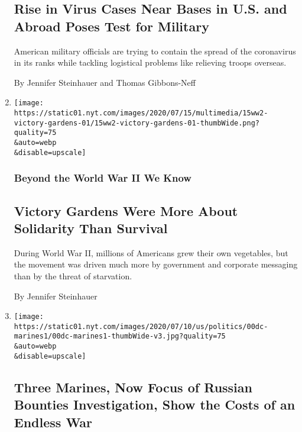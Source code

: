 \begin{enumerate}
{  \subsection{Rise in Virus Cases Near Bases in U.S. and Abroad Poses
  Test for
  Military}\label{rise-in-virus-cases-near-bases-in-us-and-abroad-poses-test-for-military}}

  American military officials are trying to contain the spread of the
  coronavirus in its ranks while tackling logistical problems like
  relieving troops overseas.

  By Jennifer Steinhauer and Thomas Gibbons-Neff
\item
  \href{/2020/07/15/magazine/victory-gardens-world-war-II.html}{}

  \texttt{[image: https://static01.nyt.com/images/2020/07/15/multimedia/15ww2-victory-gardens-01/15ww2-victory-gardens-01-thumbWide.png?quality=75\\\&auto=webp\\\&disable=upscale]}

  \hypertarget{beyond-the-world-war-ii-we-know}{%
  \subsubsection{Beyond the World War II We
  Know}\label{beyond-the-world-war-ii-we-know}}

  \hypertarget{victory-gardens-were-more-about-solidarity-than-survival}{%
  \subsection{Victory Gardens Were More About Solidarity Than
  Survival}\label{victory-gardens-were-more-about-solidarity-than-survival}}

  During World War II, millions of Americans grew their own vegetables,
  but the movement was driven much more by government and corporate
  messaging than by the threat of starvation.

  By Jennifer Steinhauer
\item
  \href{/2020/07/14/us/politics/afghanistan-russia-bounties-marines.html}{}

  \texttt{[image: https://static01.nyt.com/images/2020/07/10/us/politics/00dc-marines1/00dc-marines1-thumbWide-v3.jpg?quality=75\\\&auto=webp\\\&disable=upscale]}

  \hypertarget{three-marines-now-focus-of-russian-bounties-investigation-show-the-costs-of-an-endless-war}{%
  \subsection{Three Marines, Now Focus of Russian Bounties
  Investigation, Show the Costs of an Endless
  War}\label{three-marines-now-focus-of-russian-bounties-investigation-show-the-costs-of-an-endless-war}}


\end{enumerate}
